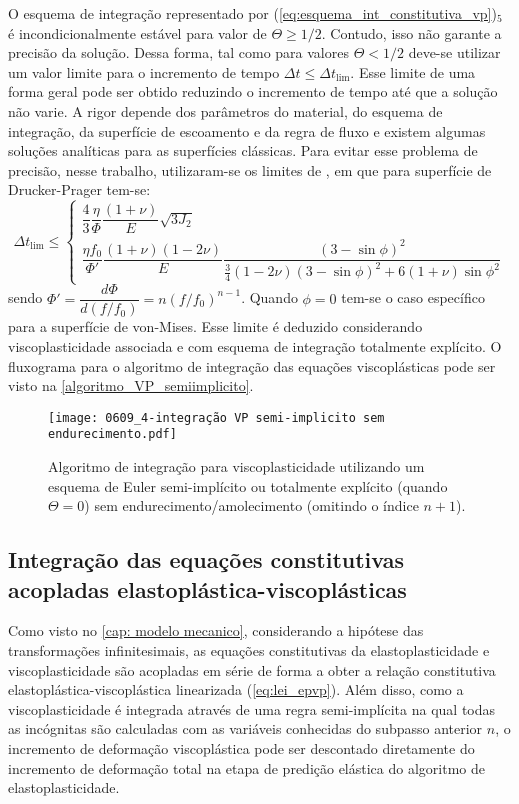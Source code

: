 O esquema de integração representado por (\ref{eq:esquema_int_constitutiva_vp})$_5$ é incondicionalmente estável para valor de $\Theta \geq 1/2$. Contudo, isso não garante a precisão da solução. Dessa forma, tal como para valores $\Theta < 1/2$ deve-se utilizar um valor limite para o incremento de tempo $\Delta t \leq \Delta t_{\text{lim}}$. Esse limite de uma forma geral pode ser obtido reduzindo o incremento de tempo até que a solução não varie. A rigor depende dos parâmetros do material, do esquema de integração, da superfície de escoamento e da regra de fluxo e existem algumas soluções analíticas para as superfícies clássicas. Para evitar esse problema de precisão, nesse trabalho, utilizaram-se os limites de , em que para superfície de Drucker-Prager tem-se:
\begin{equation}
	\label{eq:deltatmin_dp}
	\Delta t_{\text{lim}} \leq \left\{ 
		\begin{array}{lcl} 
			\dfrac{4}{3}\dfrac{\eta}{\Phi}\dfrac{(1+\nu)}{E} {\sqrt{3J_2}} \\
			\dfrac{\eta f_0}{\Phi'}\dfrac{(1+\nu)(1-2\nu)}{E}\dfrac{(3-\sin{\phi})^2}{\frac{3}{4}(1-2\nu)(3-\sin{\phi})^2 + 6(1+\nu)\sin{\phi}^2}
		\end{array} \right.
\end{equation}
sendo $\Phi'= \dfrac{d \Phi}{d(f/f_0)} = n(f/f_0)^{n-1}$. Quando $\phi = 0$ tem-se o caso específico para a superfície de von-Mises. Esse limite é deduzido considerando viscoplasticidade associada e com esquema de integração totalmente explícito. O fluxograma para o algoritmo de integração das equações viscoplásticas pode ser visto na \autoref{algoritmo_VP_semiimplicito}.
\begin{figure}[H]
	\begin{center}
		\texttt{[image: 0609\_4-integração VP semi-implicito sem endurecimento.pdf]}
	\end{center}
	\caption{\label{algoritmo_VP_semiimplicito}Algoritmo de integração para viscoplasticidade utilizando um esquema de Euler semi-implícito ou totalmente explícito (quando $\Theta = 0$) sem endurecimento/amolecimento (omitindo o índice $n+1$).}
\end{figure}

\subsection{Integração das equações constitutivas acopladas elastoplástica-viscoplásticas}
Como visto no \autoref{cap: modelo mecanico}, considerando a hipótese das transformações infinitesimais, as equações constitutivas da elastoplasticidade e viscoplasticidade são acopladas em série de forma a obter a relação constitutiva elastoplástica-viscoplástica linearizada (\ref{eq:lei_epvp}). Além disso, como a viscoplasticidade é integrada através de uma regra semi-implícita na qual todas as incógnitas são calculadas com as variáveis conhecidas do subpasso anterior $n$, o incremento de deformação viscoplástica pode ser descontado diretamente do incremento de deformação total na etapa de predição elástica do algoritmo de elastoplasticidade.

